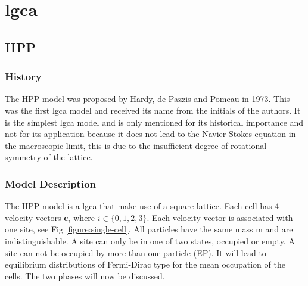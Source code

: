 \documentclass[a4paper,12pt]{article}
\begin{document}
\section{\acrfull{lgca}}
\subsection{HPP}
\subsubsection{History}
The HPP model was proposed by Hardy, de Pazzis and Pomeau in 1973.
This was the first \acrshort{lgca} model and received its name from the initials of the authors. It is the simplest \acrshort{lgca} model and is only mentioned for its historical importance and not for its application because it does not lead to the Navier-Stokes equation in the macroscopic limit, this is due to the insufficient degree of rotational symmetry of the lattice. 
\subsubsection{Model Description}
The HPP model is a \acrshort{lgca} that make use of a square lattice.
Each cell has 4 velocity vectors $\textbf{c}_{i}$ where $i \in \{0, 1, 2, 3\}$. Each velocity vector is associated with one site, see Fig \ref{figure:single-cell}. All particles have the same mass m and are indistinguishable. A site can only be in one of two states, occupied or empty. A site can not be occupied by more than one particle (\Gls{EP}). It will lead to equilibrium distributions of Fermi-Dirac type for
the mean occupation of the cells.%
The two phases will now be discussed.
\end{document}
